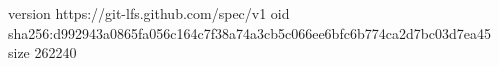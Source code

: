 version https://git-lfs.github.com/spec/v1
oid sha256:d992943a0865fa056c164c7f38a74a3cb5c066ee6bfc6b774ca2d7bc03d7ea45
size 262240
